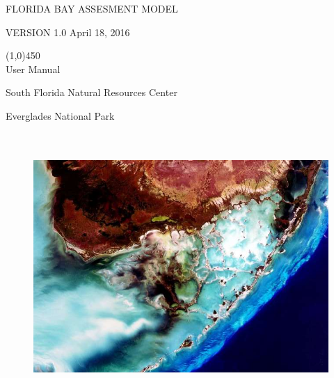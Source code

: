 \thispagestyle{empty}


\vglue 0.5in

\sffamily
\color[rgb]{0.00,0.50,0.00}

{\Huge F}{\huge LORIDA} {\Huge B}{\huge AY} {\Huge A}{\huge SSESMENT}
{\Huge M}{\huge ODEL}

{\Huge V}{\huge ERSION }{\Huge \hspace{3mm}1.0 April 18, 2016}


\line(1,0){450}\\

{\LARGE User Manual}

{\LARGE South Florida Natural Resources Center}

{\LARGE Everglades National Park}\\[0.1in]

\begin{figure}[!ht]
\begin{center}
\includegraphics[height=4in]{graphics/FloridaBayPhoto.png}\\
\end{center}
\end{figure}

